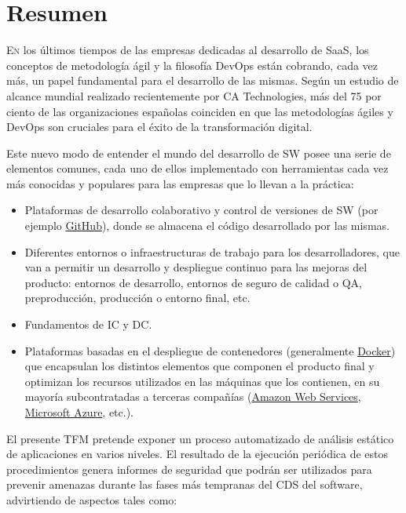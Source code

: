 \chapter*{Resumen}
\pagestyle{especial}
{}

\lettrine[lraise=-0.1, lines=2, loversize=0.2]{E}{n} los últimos tiempos de las empresas dedicadas al desarrollo de \gls{SaaS}, los conceptos de metodología ágil y la filosofía \gls{DevOps} están cobrando, cada vez más, un papel fundamental para el desarrollo de las mismas\cite{consultorit2017}. Según un estudio de alcance mundial realizado recientemente por CA Technologies, más del 75 por ciento de las organizaciones españolas coinciden en que las metodologías ágiles y \gls{DevOps} son cruciales para el éxito de la transformación digital\cite{catechnologies2017}. 

Este nuevo modo de entender el mundo del desarrollo de \gls{SW} posee una serie de elementos comunes, cada uno de ellos implementado con herramientas cada vez más conocidas y populares para las empresas que lo llevan a la práctica: 

\begin{itemize}
	\item Plataformas de desarrollo colaborativo y control de versiones de \gls{SW} (por ejemplo \href{https://github.com/}{GitHub}), donde se almacena el código desarrollado por las mismas.
	\item Diferentes entornos o infraestructuras de trabajo para los desarrolladores, que van a permitir un desarrollo y despliegue continuo para las mejoras del producto: entornos de desarrollo, entornos de seguro de calidad o \gls{QA}, preproducción, producción o entorno final, etc.
	\item Fundamentos de \gls{IC} y \gls{DC}.
	\item Plataformas basadas en el despliegue de contenedores (generalmente \href{https://www.docker.com/}{Docker}) que encapsulan los distintos elementos que componen el producto final y optimizan los recursos utilizados en las máquinas que los contienen, en su mayoría subcontratadas a terceras compañías (\href{https://aws.amazon.com/es/}{Amazon Web Services}, \href{https://azure.microsoft.com/es-es/}{Microsoft Azure}, etc.).
\end{itemize}

El presente \gls{TFM} pretende exponer un proceso automatizado de análisis estático de aplicaciones en varios niveles. El resultado de la ejecución periódica de estos procedimientos genera informes de seguridad que podrán ser utilizados para prevenir amenazas durante las fases más tempranas del \gls{CDS} del software, advirtiendo de aspectos tales como:

